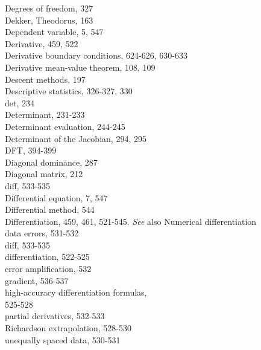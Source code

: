 \documentclass[../main.tex]{subfiles}
\begin{document}
\begin{multicols}{3}
    Degrees of freedom, 327\\
    Dekker, Theodorus, 163\\
    Dependent variable, 5, 547\\
    Derivative, 459, 522\\
    Derivative boundary conditions, 624-626, 630-633\\
    Derivative mean-value theorem, 108, 109\\
    Descent methods, 197\\
    Descriptive statistics, 326-327, 330\\
    det, 234\\
    Determinant, 231-233\\
    Determinant evaluation, 244-245\\
    Determinant of the Jacobian, 294, 295\\
    DFT, 394-399\\
    Diagonal dominance, 287\\
    Diagonal matrix, 212\\
    diff, 533-535\\
    Differential equation, 7, 547\\
    Differential method, 544\\
    Differentiation, 459, 461, 521-545. \textit{See} also Numerical differentiation\\
    \hspace*{3mm}data errors, 531-532\\
    \hspace*{3mm}diff, 533-535\\
    \hspace*{3mm}differentiation, 522-525\\
    \hspace*{3mm}error amplification, 532\\
    \hspace*{3mm}gradient, 536-537\\
    \hspace*{3mm}high-accuracy differentiation formulas,\\
    \hspace*{3mm}525-528\\
    \hspace*{3mm}partial derivatives, 532-533\\
    \hspace*{3mm}Richardson extrapolation, 528-530\\
    \hspace*{3mm}unequally spaced data, 530-531\\

\end{multicols}
\end{document}
